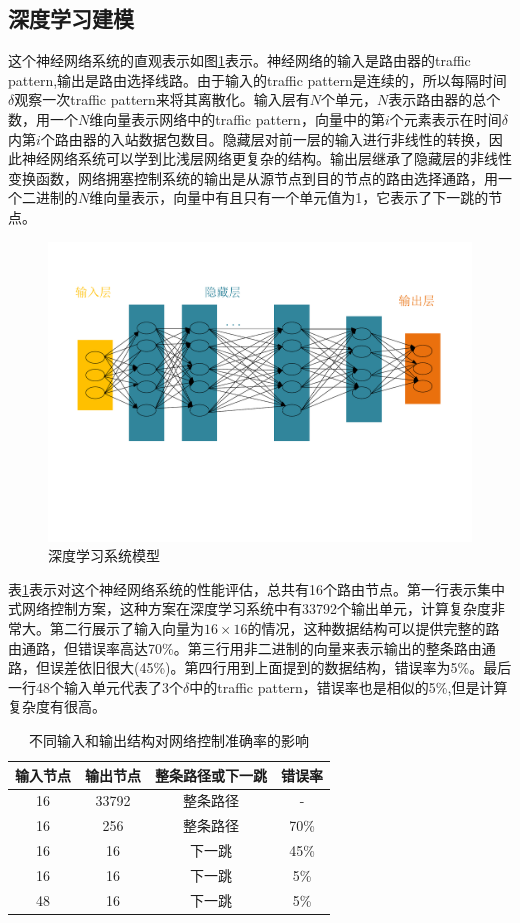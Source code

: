 \documentclass[a4paper, 11pt]{article}
\begin{document}
\begin{CJK*}{UTF8}{gbsn}
\section{深度学习建模}
这个神经网络系统的直观表示如图\ref{fig:neural_network}表示。神经网络的输入是路由器的traffic pattern,输出是路由选择线路。由于输入的traffic pattern是连续的，所以每隔时间$\delta$观察一次traffic pattern来将其离散化。输入层有$N$个单元，$N$表示路由器的总个数，用一个$N$维向量表示网络中的traffic pattern，向量中的第$i$个元素表示在时间$\delta$内第$i$个路由器的入站数据包数目。隐藏层对前一层的输入进行非线性的转换，因此神经网络系统可以学到比浅层网络更复杂的结构。输出层继承了隐藏层的非线性变换函数，网络拥塞控制系统的输出是从源节点到目的节点的路由选择通路，用一个二进制的$N$维向量表示，向量中有且只有一个单元值为1，它表示了下一跳的节点。
\begin{figure}[htb]
\centering
\includegraphics[width=.8\textwidth]{network.pdf}
\caption{深度学习系统模型}\label{fig:neural_network}
\end{figure}
表\ref{table:network_control}表示对这个神经网络系统的性能评估，总共有16个路由节点。第一行表示集中式网络控制方案，这种方案在深度学习系统中有33792个输出单元，计算复杂度非常大。第二行展示了输入向量为$16\times16$的情况，这种数据结构可以提供完整的路由通路，但错误率高达70\%。第三行用非二进制的向量来表示输出的整条路由通路，但误差依旧很大(45\%)。第四行用到上面提到的数据结构，错误率为5\%。最后一行48个输入单元代表了3个$\delta$中的traffic pattern，错误率也是相似的5\%,但是计算复杂度有很高。
\begin{table}[!htb]
\centering
\caption{不同输入和输出结构对网络控制准确率的影响}
\label{table:network_control}
\begin{tabular}{c|c|c|c}
\hline
\textbf{输入节点} & \textbf{输出节点}& \textbf{整条路径或下一跳 } & \textbf{错误率}\\ \hline
16& 33792&整条路径& -\\
16&256&整条路径& 70\% \\
16& 16&下一跳& 45\% \\
16& 16&下一跳& 5\% \\
48& 16&下一跳& 5\% \\ \hline
\end{tabular}
\end{table}


\end{CJK*}
\end{document}
